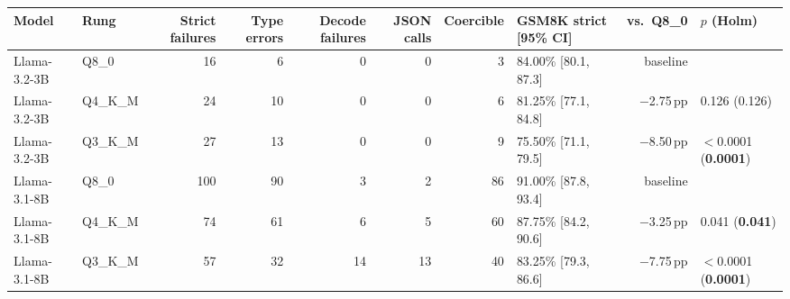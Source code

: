 \begin{tabular}{@{}llrrrrrlrl@{}}
\toprule
Model & Rung & Strict failures & Type errors & Decode failures & JSON calls & Coercible & GSM8K strict [95\% CI] & vs.\ Q8\_0 & $p$ (Holm) \\
\midrule
Llama-3.2-3B & Q8\_0 & 16 & 6 & 0 & 0 & 3 & 84.00\% [80.1, 87.3] & baseline &  \\
Llama-3.2-3B & Q4\_K\_M & 24 & 10 & 0 & 0 & 6 & 81.25\% [77.1, 84.8] & $-$2.75\,pp & 0.126 (0.126) \\
Llama-3.2-3B & Q3\_K\_M & 27 & 13 & 0 & 0 & 9 & 75.50\% [71.1, 79.5] & $-$8.50\,pp & $<$0.0001 (\textbf{0.0001}) \\
\midrule
Llama-3.1-8B & Q8\_0 & 100 & 90 & 3 & 2 & 86 & 91.00\% [87.8, 93.4] & baseline &  \\
Llama-3.1-8B & Q4\_K\_M & 74 & 61 & 6 & 5 & 60 & 87.75\% [84.2, 90.6] & $-$3.25\,pp & 0.041 (\textbf{0.041}) \\
Llama-3.1-8B & Q3\_K\_M & 57 & 32 & 14 & 13 & 40 & 83.25\% [79.3, 86.6] & $-$7.75\,pp & $<$0.0001 (\textbf{0.0001}) \\
\bottomrule
\end{tabular}
